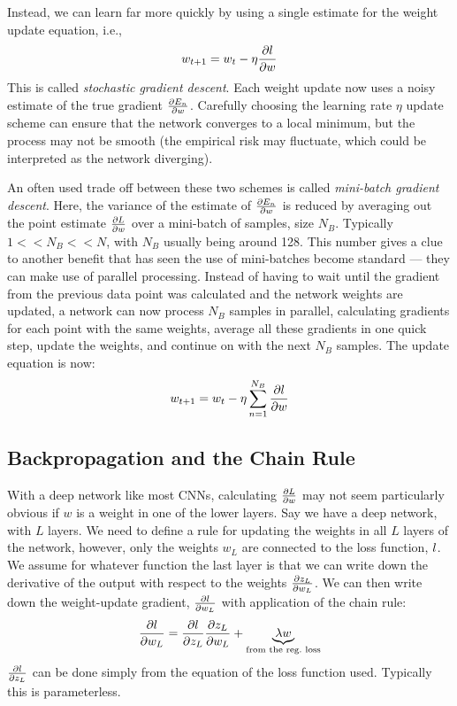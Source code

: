   Instead, we can learn far more quickly by using a single estimate for the
  weight update equation, i.e., 
  \begin{equation}
    w_{t+1} = w_{t} - \eta \frac{\partial l}{\partial w}
  \end{equation}
  This is called \emph{stochastic gradient descent}. Each weight update now
  uses a noisy estimate of the true gradient $\frac{\partial E_n}{\partial w}$. Carefully
  choosing the learning rate $\eta$ update scheme can ensure that the network
  converges to a local minimum, but the process may not be smooth (the
  empirical risk may fluctuate, which could be interpreted as the network
  diverging).

  An often used trade off between these two schemes is called \emph{mini-batch
  gradient descent}. Here, the variance of the estimate of $\frac{\partial E_n}{\partial w}$ is
  reduced by averaging out the point estimate $\frac{\partial L}{\partial w}$ over a mini-batch
  of samples, size $N_B$. Typically $1 << N_B << N$, with $N_B$ usually being
  around 128. This number gives a clue to another benefit that has seen the use
  of mini-batches become standard --- they can make use of parallel processing.
  Instead of having to wait until the gradient from the previous data point was
  calculated and the network weights are updated, a network can now process
  $N_B$ samples in parallel, calculating gradients for each point with the same
  weights, average all these gradients in one quick step, update the weights,
  and continue on with the next $N_B$ samples. The update equation is now:
  \begin{equation}
    w_{t+1} = w_{t} - \eta \sum_{n=1}^{N_B} \frac{\partial l}{\partial w}
  \end{equation}

\subsection{Backpropagation and the Chain Rule}
  With a deep network like most CNNs, calculating $\frac{\partial L}{\partial w}$ may not seem
  particularly obvious if $w$ is a weight in one of the lower layers.  Say we
  have a deep network, with $L$ layers. We need to define a rule for updating
  the weights in all $L$ layers of the network, however, only the weights $w_L$
  are connected to the loss function, $l$. We assume for whatever function
  the last layer is that we can write down the derivative of the output with
  respect to the weights $\frac{\partial z_{L}}{\partial w_{L}}$. We can then write down the
  weight-update gradient, $\frac{\partial l}{\partial w_L}$ with application of the chain rule:
  \begin{equation}
    \frac{\partial l}{\partial w_L} = \frac{\partial l}{\partial z_L} \frac{\partial z_L}{\partial w_L} + \underbrace{\lambda
    w}_{\text{from the reg.\ loss}}
  \end{equation}
  $\frac{\partial l}{\partial z_L}$ can be done simply from the equation of the loss function
  used. Typically this is parameterless.


